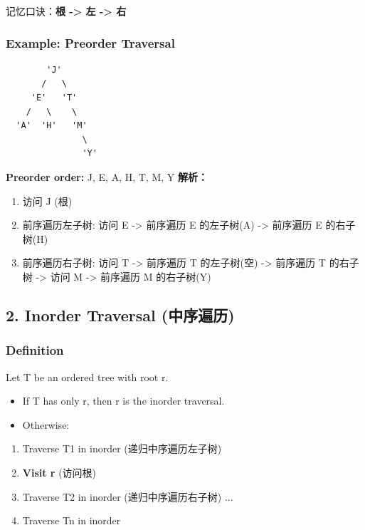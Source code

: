 \documentclass[10pt,a4paper,openany]{ctexbook}
\theoremstyle{definition}
\theoremstyle{remark}
\renewenvironment{quote}
  {\list{}{\leftmargin=1em\rightmargin=0pt\topsep=0.5pt\partopsep=0pt}\item[]}
  {\endlist}
\begin{document}
\begin{quote}
记忆口诀：\textbf{根 -> 左 -> 右}

\end{quote}

\subsubsection{Example: Preorder Traversal}

{\footnotesize\begin{verbatim}
        'J'
       /   \
     'E'   'T'
    /   \    \
  'A'  'H'   'M'
               \
               'Y'
\end{verbatim}}

\textbf{Preorder order:} J, E, A, H, T, M, Y
\textbf{解析：}
\begin{enumerate}
\item 访问 J (根)
\item 前序遍历左子树: 访问 E -> 前序遍历 E 的左子树(A) -> 前序遍历 E 的右子树(H)
\item 前序遍历右子树: 访问 T -> 前序遍历 T 的左子树(空) -> 前序遍历 T 的右子树 -> 访问 M -> 前序遍历 M 的右子树(Y)

\end{enumerate}

\vspace{-2pt}

\subsection{2. Inorder Traversal (中序遍历)}

\subsubsection{Definition}

Let T be an ordered tree with root r.
\begin{itemize}
\item If T has only r, then r is the inorder traversal.
\item Otherwise:
\end{itemize}

\begin{enumerate}
\item Traverse T1 in inorder (递归中序遍历左子树)
\item \textbf{Visit r} (访问根)
\item Traverse T2 in inorder (递归中序遍历右子树)
...

\item Traverse Tn in inorder

\end{enumerate}
\end{document}
